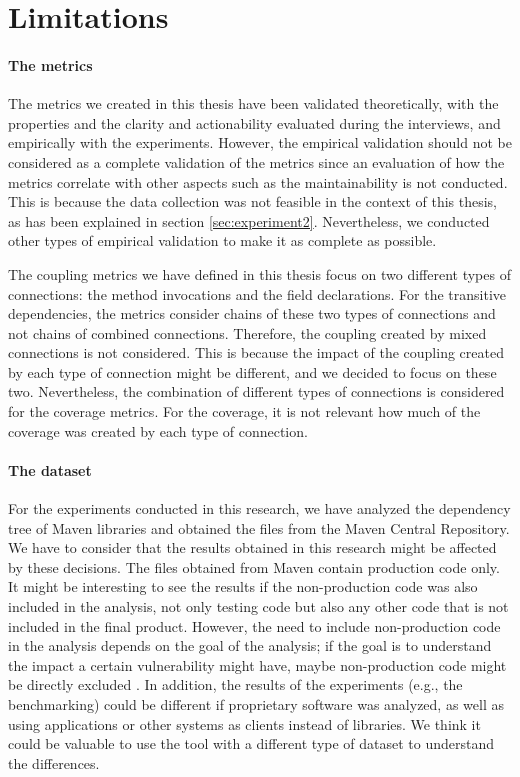 \section{Limitations}

\paragraph{The metrics}

The metrics we created in this thesis have been validated theoretically, with the properties and the clarity and actionability evaluated during the interviews, and empirically with the experiments. However, the empirical validation should not be considered as a complete validation of the metrics since an evaluation of how the metrics correlate with other aspects such as the maintainability is not conducted. This is because the data collection was not feasible in the context of this thesis, as has been explained in section \ref{sec:experiment2}. Nevertheless, we conducted other types of empirical validation to make it as complete as possible.

The coupling metrics we have defined in this thesis focus on two different types of connections: the method invocations and the field declarations. For the transitive dependencies, the metrics consider chains of these two types of connections and not chains of combined connections. Therefore, the coupling created by mixed connections is not considered. This is because the impact of the coupling created by each type of connection might be different, and we decided to focus on these two. Nevertheless, the combination of different types of connections is considered for the coverage metrics. For the coverage, it is not relevant how much of the coverage was created by each type of connection.

\paragraph{The dataset}

For the experiments conducted in this research, we have analyzed the dependency tree of Maven libraries and obtained the files from the Maven Central Repository. We have to consider that the results obtained in this research might be affected by these decisions. The files obtained from Maven contain production code only. It might be interesting to see the results if the non-production code was also included in the analysis, not only testing code but also any other code that is not included in the final product. However, the need to include non-production code in the analysis depends on the goal of the analysis; if the goal is to understand the impact a certain vulnerability might have, maybe non-production code might be directly excluded \cite{pashchenko2018vulnerable}. In addition, the results of the experiments (e.g., the benchmarking) could be different if proprietary software was analyzed, as well as using applications or other systems as clients instead of libraries. We think it could be valuable to use the tool with a different type of dataset to understand the differences.
